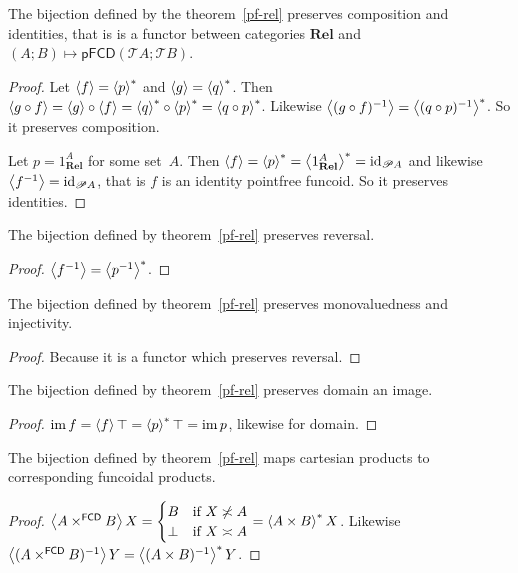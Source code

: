 \begin{prop}
The bijection defined by the theorem~\ref{pf-rel} preserves composition
and identities, that is is a functor between categories $\mathbf{Rel}$
and $(A;B)\mapsto\mathsf{pFCD}(\mathscr{T}A;\mathscr{T}B)$.\end{prop}
\begin{proof}
Let $\left\langle f\right\rangle=\left\langle p\right\rangle ^{\ast}$ and $\left\langle g\right\rangle=\left\langle q\right\rangle ^{\ast}$. Then $\left\langle g\circ f\right\rangle=\left\langle g\right\rangle\circ\left\langle f\right\rangle=\left\langle q\right\rangle ^{\ast}\circ\left\langle p\right\rangle ^{\ast}=\left\langle q\circ p\right\rangle ^{\ast}$.
Likewise $\left\langle (g\circ f)^{-1}\right\rangle=\left\langle (q\circ p)^{-1}\right\rangle ^{\ast}$. So
it preserves composition.

Let $p=1_{\mathbf{Rel}}^{A}$ for some set~$A$. Then $\left\langle f\right\rangle=\left\langle p\right\rangle ^{\ast}=\left\langle 1_{\mathbf{Rel}}^{A}\right\rangle ^{\ast}=\operatorname{id}_{\mathscr{P} A}$
and likewise $\left\langle f^{-1}\right\rangle=\operatorname{id}_{\mathscr{P} A}$, that is $f$ is
an identity pointfree funcoid. So it preserves identities.\end{proof}
\begin{prop}
The bijection defined by theorem~\ref{pf-rel} preserves reversal.\end{prop}
\begin{proof}
$\left\langle f^{-1}\right\rangle=\left\langle p^{-1}\right\rangle ^{\ast}$.\end{proof}
\begin{prop}
The bijection defined by theorem~\ref{pf-rel} preserves monovaluedness
and injectivity.\end{prop}
\begin{proof}
Because it is a functor which preserves reversal.\end{proof}
\begin{prop}
The bijection defined by theorem~\ref{pf-rel} preserves domain
an image.\end{prop}
\begin{proof}
$\operatorname{im} f=\left\langle f\right\rangle\top=\left\langle p\right\rangle ^{\ast}\top=\operatorname{im} p$, likewise for domain.\end{proof}
\begin{prop}
The bijection defined by theorem~\ref{pf-rel} maps cartesian
products to corresponding funcoidal products.\end{prop}
\begin{proof}
$\left\langle A\times^{\mathsf{FCD}}B\right\rangle X=\begin{cases}
B & \text{if }X\not\asymp A\\
\bot & \text{if }X\asymp A
\end{cases}=\left\langle A\times B\right\rangle ^{\ast}X$. Likewise $\left\langle (A\times^{\mathsf{FCD}}B)^{-1}\right\rangle Y=\left\langle (A\times B)^{-1}\right\rangle ^{\ast}Y$.\end{proof}

